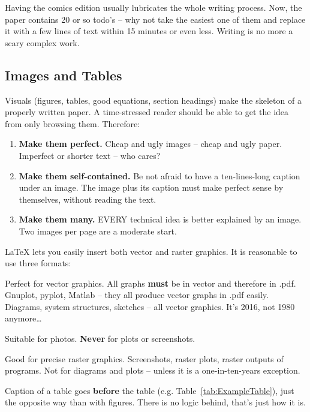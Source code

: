 \documentclass{ExcelAtFIT}
\begin{document}
Having the comics edition usually lubricates the whole writing process.  Now, the paper contains 20 or so todo's -- why not take the easiest one of them and replace it with a few lines of text within 15 minutes or even less.  Writing is no more a scary complex work.

\subsection{Images and Tables}
\label{sec:Images}

Visuals (figures, tables, good equations, section headings) make the skeleton of a properly written paper.  A time-stressed reader should be able to get the idea from only browsing them.
Therefore:
\begin{enumerate}[noitemsep]
\item \textbf{Make them perfect.}  Cheap and ugly images -- cheap and ugly paper.  Imperfect or shorter text -- who cares?
\item \textbf{Make them self-contained.}  Be not afraid to have a ten-lines-long caption under an image.  The image plus its caption must make perfect sense by themselves, without reading the text.
\item \textbf{Make them many.}  EVERY technical idea is better explained by an image.  Two images per page are a moderate start.
\end{enumerate}
\LaTeX{} lets you easily insert both vector and raster graphics. It is reasonable to use three formats:
\begin{description}[noitemsep]
\item[.pdf] Perfect for vector graphics.  All graphs \textbf{must} be in vector and therefore in .pdf.  Gnuplot, pyplot, Matlab -- they all produce vector graphs in .pdf easily.  Diagrams, system structures, sketches -- all vector graphics.  It's 2016, not 1980 anymore\ldots
\item[.jpg] Suitable for photos.  \textbf{Never} for plots or screenshots.
\item[.png] Good for precise raster graphics.  Screenshots, raster plots, raster outputs of programs.  Not for diagrams and plots -- unless it is a one-in-ten-years exception.
\end{description}
Caption of a table goes \textbf{before} the table (e.g. Table~\ref{tab:ExampleTable}), just the opposite way than with figures.  There is no logic behind, that's just how it is.
\end{document}
